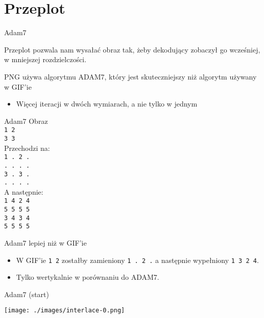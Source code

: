 \documentclass[presentation]{beamer}
\begin{document}
\section{Przeplot}
\label{sec:orgcd09956}
\begin{frame}[label={sec:org0912a1f}]{Adam7}
\begin{block}{Przeplot pozwala nam wysałać obraz tak, żeby dekodujący zobaczył go wcześniej, w mniejszej rozdzielczości.}
\end{block}
\begin{block}{PNG używa algorytmu ADAM7, który jest skuteczniejszy niż algorytm używany w GIF'ie}
\begin{itemize}
\item Więcej iteracji w dwóch wymiarach, a nie tylko w jednym
\end{itemize}
\end{block}
\end{frame}
\begin{frame}[label={sec:org2477be6}]{Adam7}
Obraz \\
\texttt{1 2} \\
\texttt{3 3} \\

Przechodzi na: \\
\texttt{1 . 2 .} \\
\texttt{. . . .} \\
\texttt{3 . 3 .} \\
\texttt{. . . .} \\

A następnie: \\
\texttt{1 4 2 4} \\
\texttt{5 5 5 5} \\
\texttt{3 4 3 4} \\
\texttt{5 5 5 5} \\
\end{frame}

\begin{frame}[label={sec:org4a73cb5}]{Adam7 lepiej niż w GIF'ie}
\begin{itemize}
\item W GIF'ie \texttt{1 2} zostałby zamieniony \texttt{1 . 2 .} a
następnie wypełniony \texttt{1 3 2 4}.
\item Tylko wertykalnie w porównaniu do ADAM7.
\end{itemize}
\end{frame}

\begin{frame}[label={sec:org287e6a5}]{Adam7 (start)}
\begin{center}
\texttt{[image: ./images/interlace-0.png]}
\end{center}
\end{frame}
\end{document}
